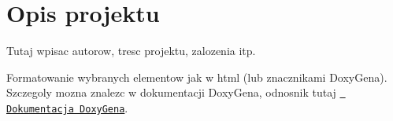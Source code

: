 \chapter{Opis projektu}
\hypertarget{opis_projektu}{}\label{opis_projektu}
Tutaj wpisac autorow, tresc projektu, zalozenia itp.

Formatowanie wybranych elementow jak w html (lub znacznikami Doxy\+Gena). Szczegoly mozna znalezc w dokumentacji Doxy\+Gena, odnosnik tutaj \href{https://doxygen.nl/manual/index.html}{\texttt{ Dokumentacja Doxy\+Gena}}. 